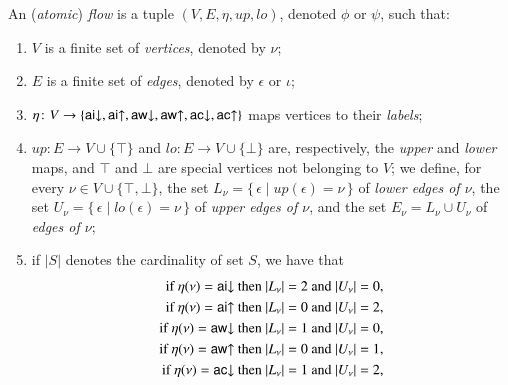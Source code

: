 \newcommand{\ppl  }{{\mathchoice{\scriptstyle+}
                                {\scriptstyle+}
                                {\scriptstyle+}
                                {\scriptscriptstyle+}}}
\newcommand{\pmi  }{{\mathchoice{\scriptstyle-}
                                {\scriptstyle-}
                                {\scriptstyle-}
                                {\scriptscriptstyle-}}}
\newcommand{\card}[1]{\mathord\vert #1\mathord\vert}
\newcommand{\up}{{\mathit up}}
\newcommand{\lo}{{\mathit lo}}
\begin{definition}\label{definition:AtomicFlow}
An (\emph{atomic}) \emph{flow} is a tuple $(V,E,\eta,\up,\lo)$, denoted $\phi$ or $\psi$, such that:
\begin{enumerate}
\item $V$ is a finite set of \emph{vertices}, denoted by $\nu$;
\item $E$ is a finite set of \emph{edges}, denoted by $\epsilon$ or $\iota$;
\item $\eta\colon V\to\{{{\mathsf{ai}}{\downarrow}},{{\mathsf{ai}}{\uparrow}},{{\mathsf{aw}}{\downarrow}},{{\mathsf{aw}}{\uparrow}},{{\mathsf{ac}}{\downarrow}},{{\mathsf{ac}}{\uparrow}}\}$ maps vertices to their \emph{labels};
\item $\up\colon E\to V\cup\{\top\}$ and $\lo\colon E\to V\cup\{\bot\}$ are, respectively, the \emph{upper} and \emph{lower} maps, and $\top$ and $\bot$ are special vertices not belonging to $V$; we define, for every $\nu\in V\cup\{\top,\bot\}$, the set $L_\nu=\{\,\epsilon\mid\up(\epsilon)=\nu\,\}$ of \emph{lower edges of $\nu$}, the set $U_\nu=\{\,\epsilon\mid\lo(\epsilon)=\nu\,\}$ of \emph{upper edges of $\nu$}, and the set $E_\nu=L_\nu\cup U_\nu$ of \emph{edges of $\nu$};
\item if $\card S$ denotes the cardinality of set $S$, we have that
\begin{align*}
\mbox{if $\eta(\nu)=\aid$ then $\card{L_\nu}=2$ and $\card{U_\nu}=0$,}&\\
\mbox{if $\eta(\nu)=\aiu$ then $\card{L_\nu}=0$ and $\card{U_\nu}=2$,}&\\
\mbox{if $\eta(\nu)=\awd$ then $\card{L_\nu}=1$ and $\card{U_\nu}=0$,}&\\
\mbox{if $\eta(\nu)=\awu$ then $\card{L_\nu}=0$ and $\card{U_\nu}=1$,}&\\
\mbox{if $\eta(\nu)=\acd$ then $\card{L_\nu}=1$ and $\card{U_\nu}=2$,}&\\

\end{align*}
\end{enumerate}
\end{definition}
